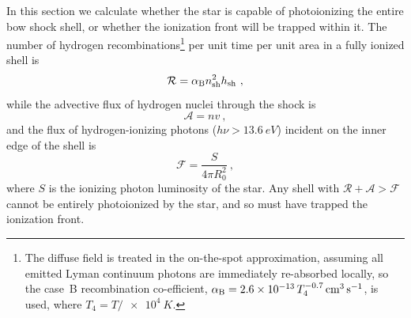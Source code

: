 In this section we calculate whether the star is capable of
photoionizing the entire bow shock shell, or whether the ionization
front will be trapped within it.  The number of hydrogen
recombinations\footnote{%
  The diffuse field is treated in the on-the-spot approximation,
  assuming all emitted Lyman continuum photons are immediately
  re-absorbed locally, so the case~B recombination co-efficient,
  \(\alphaB = \num{2.6e-13}\, T_4^{-0.7}\, \si{cm^3.s^{-1}}\), is
  used, where \(T_4 = T/\SI{e4}{K}\).} %
per unit time per unit area in a fully ionized shell is
\begin{equation}
  \label{eq:shell-recombination-rate}
  \mathcal{R} = \alphaB n\shell^2 h\shell \ ,
\end{equation}
while the advective flux of hydrogen nuclei through the shock is 
\begin{equation}
  \label{eq:shell-advective-flux}
  \mathcal{A} = n v \ ,
\end{equation}
and the flux of hydrogen-ionizing photons
(\(h \nu > \SI{13.6}{eV}\)) incident on the inner edge of the shell is
\begin{equation}
  \label{eq:shell-ionizing-flux}
  \mathcal{F} = \frac{S} {4 \pi R_0^2} \ , 
\end{equation}
where \(S\) is the ionizing photon luminosity of the star.  Any shell
with \(\mathcal{R} + \mathcal{A} > \mathcal{F}\) cannot be entirely
photoionized by the star, and so must have trapped the ionization
front.


